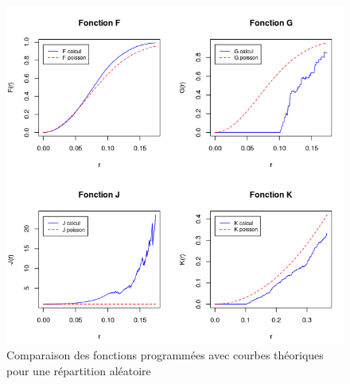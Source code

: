 \documentclass[stage2a]{tnreport}
\begin{document}
\vspace*{2cm}
\begin{center}
\begin{figure}[h]
  \centering
  \includegraphics[scale=0.7]{figures/calcul&poisson.png}
  \caption{Comparaison des fonctions programmées avec courbes théoriques pour une répartition aléatoire}
  \label{fig:compPoisson}
\end{figure}
\end{center}
\newpage
\end{document}

